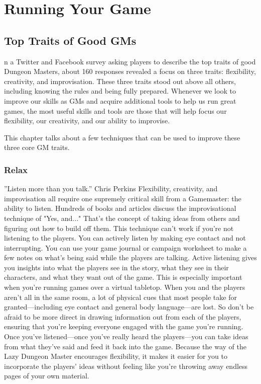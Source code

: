 \documentclass[10pt,a4paper,twoside,bg=print,twocolumn,openany,nodeprecatedcode]{dndbook}
\begin{document}
\chapter{Running Your Game}
\section{Top Traits of Good GMs}
n a Twitter and Facebook survey asking players to describe the top traits of good Dungeon Masters, about 160 responses revealed a focus on three traits: flexibility, creativity, and improvisation. These three traits stood out above all others, including knowing the rules and being fully prepared. Whenever we look to improve our skills as GMs and acquire additional tools to help us run great games, the most useful skills and tools are those that will help focus our flexibility, our creativity, and our ability to improvise.

This chapter talks about a few techniques that can be used to improve these three core GM traits.
\subsection{Relax}
\DndQuote%
{}
{''Listen more than you talk.''}
{Chris Perkins}
Flexibility, creativity, and improvisation all require one supremely critical skill from a Gamemaster: the ability to listen. Hundreds of books and articles discuss the improvisational technique of "Yes, and..." That's the concept of taking ideas from others and figuring out how to build off them. This technique can't work if you're not listening to the players.
You can actively listen by making eye contact and not interrupting. You can use your game journal or campaign worksheet to make a few notes on what's being said while the players are talking. Active listening gives you insights into what the players see in the story, what they see in their characters, and what they want out of the game.
This is especially important when you're running games over a virtual tabletop. When you and the players aren't all in the same room, a lot of physical cues that most people take for granted—including eye contact and general body language—are lost. So don't be afraid to be more direct in drawing information out from each of the players, ensuring that you're keeping everyone engaged with the game you're running.
Once you've listened—once you've really heard the players—you can take ideas from what they've said and feed it back into the game. Because the way of the Lazy Dungeon Master encourages flexibility, it makes it easier for you to incorporate the players' ideas without feeling like you're throwing away endless pages of your own material.
\end{document}
